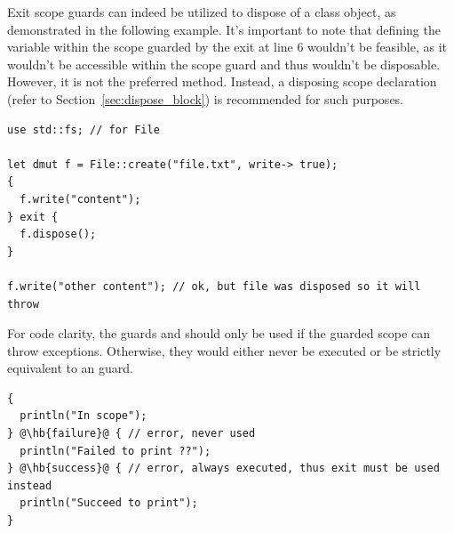 Exit scope guards can indeed be utilized to dispose of a class object, as
demonstrated in the following example. It's important to note that defining the
variable  within the scope guarded by the exit at line 6 wouldn't be
feasible, as it wouldn't be accessible within the scope guard and thus wouldn't
be disposable. However, it is not the preferred method. Instead, a disposing
scope declaration (refer to Section~\ref{sec:dispose_block}) is recommended for
such purposes.

\begin{lstlisting}[style=coloredverbatim]
use std::fs; // for File

let dmut f = File::create("file.txt", write-> true);
{
  f.write("content");
} exit {
  f.dispose();
}

f.write("other content"); // ok, but file was disposed so it will throw
\end{lstlisting}

For code clarity, the guards  and  should only be
used if the guarded scope can throw exceptions. Otherwise, they would either
never be executed or be strictly equivalent to an  guard.

\begin{lstlisting}[style=coloredverbatim, escapechar=@]
{
  println("In scope");
} @\hb{failure}@ { // error, never used
  println("Failed to print ??");
} @\hb{success}@ { // error, always executed, thus exit must be used instead
  println("Succeed to print");
}
\end{lstlisting}

\vfill%
\pagebreak
